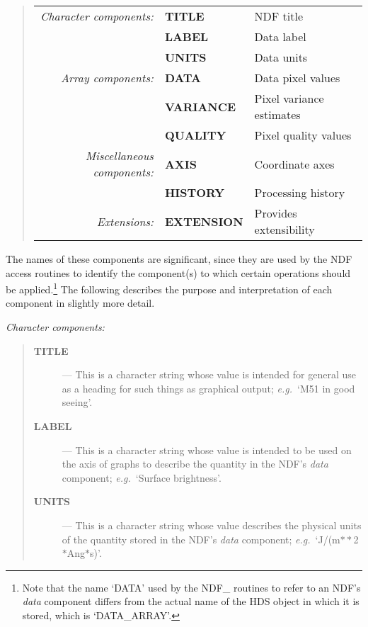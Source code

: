 \begin{quote}

\begin{small}
\begin{center}
\begin{tabular}{rl@{ --- }l}
    {\em Character components:} & {\bf TITLE} & NDF title\\
                                & {\bf LABEL} & Data label\\
                                & {\bf UNITS} & Data units\\[1ex]
        {\em Array components:} & {\bf DATA}  & Data pixel values\\
                                & {\bf VARIANCE} & Pixel variance estimates\\
                                & {\bf QUALITY} & Pixel quality values\\[1ex]
{\em Miscellaneous components:} & {\bf AXIS}  & Coordinate axes\\
                                & {\bf HISTORY} & Processing
                                                  history\footnotemark\\[1ex]
              {\em Extensions:} & {\bf EXTENSION} & Provides extensibility
\end{tabular}
\end{center}
\end{small}

\end{quote}

The names of these components are significant, since they are used by the
NDF access routines to identify the component(s) to which certain operations
should be applied.\footnote{Note that the name `DATA' used by the NDF\_
routines to refer to an NDF's {\em data\/} component differs from the actual
name of the HDS object in which it is stored, which is `DATA\_ARRAY'.}
The following describes the purpose and interpretation of each component in
slightly more detail.

{\large \em Character components:}

\begin{quote}
\begin{description}

\item[{\bf TITLE}] --- This is a character string whose value is intended for
general use as a heading for such things as graphical output;
{\em e.g.}\ `M51 in good seeing'.

\item[{\bf LABEL}] --- This is a character string whose value is intended to be
used on the axis of graphs to describe the quantity in the NDF's {\em data\/}
component; {\em e.g.}\ `Surface brightness'.

\item[{\bf UNITS}] --- This is a character string whose value describes the
physical units of the quantity stored in the NDF's {\em data\/} component;
{\em e.g.}\ `J/(m$**$2$*$Ang$*$s)'.

\end{description}
\end{quote}

